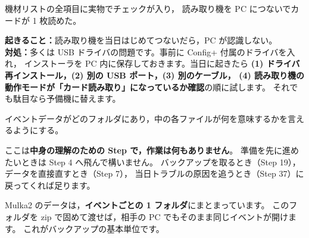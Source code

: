 \begin{Done}
機材リストの全項目に実物でチェックが入り，
読み取り機を PC につないでカードが 1 枚読めた。
\end{Done}

\begin{Fail}
\textbf{起きること：}読み取り機を当日はじめてつないだら，PC が認識しない。\\
\textbf{対処：}多くは USB ドライバの問題です。事前に Config+ 付属のドライバを入れ，
インストーラを PC 内に保存しておきます。当日に起きたら
\textbf{(1) ドライバ再インストール，(2) 別の USB ポート，(3) 別のケーブル，
(4) 読み取り機の動作モードが「カード読み取り」になっているか確認}の順に試します。
それでも駄目なら予備機に替えます。
\end{Fail}


\begin{Goal}
イベントデータがどのフォルダにあり，中の各ファイルが何を意味するかを言えるようにする。
\end{Goal}

\begin{Note}
ここは\textbf{中身の理解のための Step で，作業は何もありません}。
準備を先に進めたいときは Step 4 へ飛んで構いません。
バックアップを取るとき（Step 19），データを直接直すとき（Step 7），
当日トラブルの原因を追うとき（Step 37）に戻ってくれば足ります。
\end{Note}

Mulka2 のデータは，\textbf{イベントごとの 1 フォルダ}にまとまっています。
このフォルダを zip で固めて渡せば，相手の PC でもそのまま同じイベントが開けます。
これがバックアップの基本単位です。

